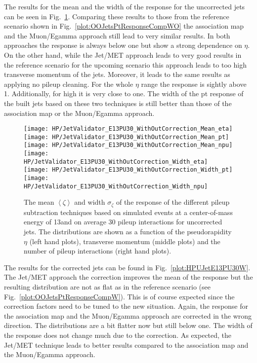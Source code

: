 The results for the mean and the width of the \pt{} response for the uncorrected jets can be seen in Fig.~\ref{plot:HPUJetE13PU30WO}. Comparing these results to those from the reference scenario shown in Fig.~\ref{plot:OOJetsPtResponseCompWO} the association map and the Muon/Egamma approach still lead to very similar results. In both approaches the \pt{} response is always below one but show a strong dependence on $\eta$. On the other hand, while the Jet/MET approach leads to very good results in the reference scenario for the upcoming scenario this approach leads to too high transverse momentum of the jets. Moreover, it leads to the same results as applying no pileup cleaning. For the whole $\eta$ range the \pt{} response is sightly above 1. Additionally, for high \pt{} it is very close to one. The width of the pt response of the built jets based on these two techniques is still better than those of the association map or the Muon/Egamma approach. 

\begin{figure}[h!t]
  \centering
  \texttt{[image: HP/JetValidator\_E13PU30\_WithOutCorrection\_Mean\_eta]}
  \texttt{[image: HP/JetValidator\_E13PU30\_WithOutCorrection\_Mean\_pt]}
  \texttt{[image: HP/JetValidator\_E13PU30\_WithOutCorrection\_Mean\_npu]}
  \\
  \texttt{[image: HP/JetValidator\_E13PU30\_WithOutCorrection\_Width\_eta]}
  \texttt{[image: HP/JetValidator\_E13PU30\_WithOutCorrection\_Width\_pt]}
  \texttt{[image: HP/JetValidator\_E13PU30\_WithOutCorrection\_Width\_npu]}
  \caption[Mean and width of the \pt{} response of different pileup subtraction techniques based on simulated \ttbar events with 13\TeV and PU=30 for uncorrected jets]{The mean $\left<\zeta\right>$ and width $\sigma_{\zeta}$ of the \pt{} response of the different pileup subtraction techniques based on simulated \ttbar events at a center-of-mass energy of 13\TeV and on average 30 pileup interactions for uncorrected jets. The distributions are shown as a function of the pseudorapidity $\eta$ (left hand plots), transverse momentum (middle plots) and the number of pileup interactions (right hand plots). \label{plot:HPUJetE13PU30WO}}
\end{figure}

The results for the corrected jets can be found in Fig.~\ref{plot:HPUJetE13PU30W}. The Jet/MET approach the correction improves the mean of the \pt{} response but the resulting distribution are not as flat as in the reference scenario (see Fig.~\ref{plot:OOJetsPtResponseCompW}). This is of course expected since the correction factors need to be tuned to the new situation. Again, the \pt{} response for the association map and the Muon/Egamma approach are corrected in the wrong direction. The distributions are a bit flatter now but still below one. The width of the \pt{} response does not change much due to the correction. As expected, the Jet/MET technique leads to better results compared to the association map and the Muon/Egamma approach.

